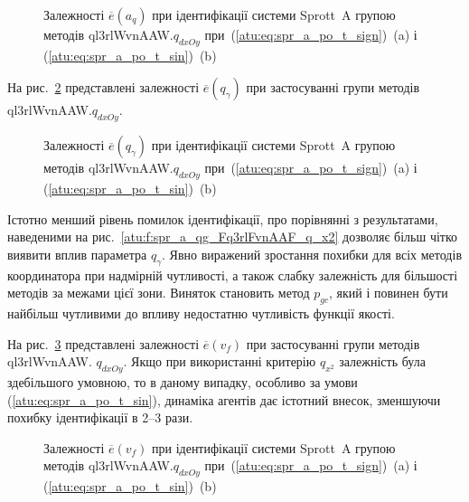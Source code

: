 \begin{figure}[htb!]
  \caption{Залежності $\overline{e} (a_q)$ при ідентифікації системи Sprott~A групою методів ql3rlWvnAAW.$q_{dxOy}$ при~(\ref{atu:eq:spr_a_po_t_sign})~(a) і (\ref{atu:eq:spr_a_po_t_sin})~(b)}
\label{atu:f:spr_a_a_q_ql3rlWvnAAW_q_dxOy}
\end{figure}

На рис.~\ref{atu:f:spr_a_ql3rlWvnAAW_q_dxOy} представлені залежності
$\overline{e} (q_\gamma)$ при застосуванні групи методів
ql3rlWvnAAW.$q_{dxOy}$.

\begin{figure}[htb!]
  \caption{Залежності $\overline{e} (q_\gamma)$ при ідентифікації системи Sprott~A групою методів ql3rlWvnAAW.$q_{dxOy}$ при~(\ref{atu:eq:spr_a_po_t_sign})~(a) і (\ref{atu:eq:spr_a_po_t_sin})~(b)}
  \label{atu:f:spr_a_ql3rlWvnAAW_q_dxOy}
\end{figure}

Істотно менший рівень помилок ідентифікації, про порівнянні з
результатами, наведеними на рис.~\ref{atu:f:spr_a_qg_Fq3rlFvnAAF_q_x2} дозволяє
більш чітко виявити вплив параметра
$q_\gamma$. Явно виражений зростання похибки для всіх методів
координатора при надмірній чутливості, а також слабку
залежність для більшості методів за межами цієї зони. Виняток
становить метод
$p_{gc}$, який і повинен бути найбільш чутливими до впливу
недостатню чутливість функції якості.

На рис.~\ref{atu:f:spr_a_v_f_ql3rlWvnAAW_q_dxOy} представлені залежності
$\overline{e}(v_f)$ при застосуванні групи методів ql3rlWvnAAW.
$q_{dxOy}$. Якщо при використанні критерію
$q_{x^2}$ залежність була здебільшого умовною, то в даному випадку,
особливо за умови (\ref{atu:eq:spr_a_po_t_sin}), динаміка агентів дає істотний
внесок, зменшуючи похибку ідентифікації в 2--3 рази.

\begin{figure}[htb!]
  \caption{Залежності $\overline{e} (v_f)$ при ідентифікації системи Sprott~A групою методів ql3rlWvnAAW.$q_{dxOy}$ при~(\ref{atu:eq:spr_a_po_t_sign})~(a) і (\ref{atu:eq:spr_a_po_t_sin})~(b)}
  \label{atu:f:spr_a_v_f_ql3rlWvnAAW_q_dxOy}
\end{figure}

